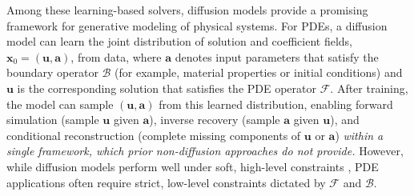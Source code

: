 \documentclass{article}
\theoremstyle{plain}
\theoremstyle{definition}
\theoremstyle{remark}
\def\va{{\bm{a}}}
\def\vu{{\bm{u}}}
\def\vx{{\bm{x}}}
\begin{document}

Among these learning-based solvers, diffusion models \cite{ho2020ddpm, song2020score} provide a promising framework for generative modeling of physical systems. For PDEs, a diffusion model can learn the joint distribution of solution and coefficient fields, $\vx_0=(\vu,\va)$, from data, where $\va$ denotes input parameters that satisfy the boundary operator $\mathcal{B}$ (for example, material properties or initial conditions) and $\vu$ is the corresponding solution that satisfies the PDE operator $\mathcal{F}$. After training, the model can sample $(\vu,\va)$ from this learned distribution, enabling forward simulation (sample $\vu$ given $\va$), inverse recovery (sample $\va$ given $\vu$), and conditional reconstruction (complete missing components of $\vu$ or $\va$) \emph{within a single framework, which prior non-diffusion approaches \cite{li2020fno, lu2019deeponet, raissi2019pinn} do not provide.} However, while diffusion models perform well under soft, high-level constraints \cite{rombach2022ldm, esser2024sd3, ho2022cfg, chung2022dps, ben2024dflow}, PDE applications often require strict, low-level constraints dictated by $\mathcal{F}$ and $\mathcal{B}$.
\end{document}
